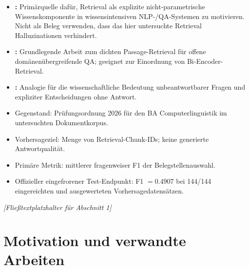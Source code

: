 \documentclass[11pt]{article}
\begin{document}
\begin{quellenbox}
\begin{itemize}
    \item \textbf{\citet{lewis2020rag}:} Prim\"arquelle daf\"ur, Retrieval als explizite nicht-parametrische Wissenskomponente in wissensintensiven NLP-/QA-Systemen zu motivieren. Nicht als Beleg verwenden, dass das hier untersuchte Retrieval Halluzinationen verhindert.
    \item \textbf{\citet{karpukhin-etal-2020-dense}:} Grundlegende Arbeit zum dichten Passage-Retrieval f\"ur offene domänenübergreifende QA; geeignet zur Einordnung von Bi-Encoder-Retrieval.
    \item \textbf{\citet{rajpurkar-etal-2018-know}:} Analogie f\"ur die wissenschaftliche Bedeutung unbeantwortbarer Fragen und expliziter Entscheidungen ohne Antwort.
\end{itemize}
\end{quellenbox}

\begin{faktenbox}
\begin{itemize}
    \item Gegenstand: Pr\"ufungsordnung 2026 f\"ur den BA Computerlinguistik im untersuchten Dokumentkorpus.
    \item Vorhersageziel: Menge von Retrieval-Chunk-IDs; keine generierte Antwortqualit\"at.
    \item Prim\"are Metrik: mittlerer fragenweiser F1 der Belegstellenauswahl.
    \item Offizieller eingefrorener Test-Endpunkt: F1 $=0.4907$ bei 144/144 eingereichten und ausgewerteten Vorhersagedatensätzen.
\end{itemize}
\end{faktenbox}

\textit{[Fließtextplatzhalter für Abschnitt 1]}



\section{Motivation und verwandte Arbeiten}
\end{document}

